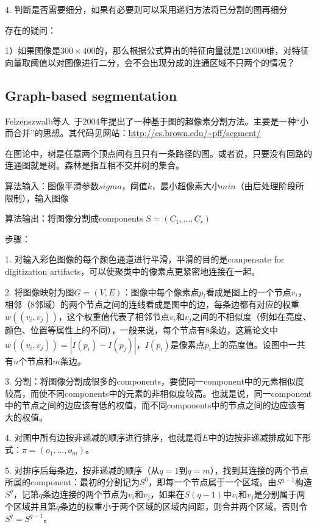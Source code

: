 \documentclass[12pt]{article}
\begin{document}
4. 判断是否需要细分，如果有必要则可以采用递归方法将已分割的图再细分

存在的疑问：

1）如果图像是$300 \times 400$的，那么根据公式算出的特征向量就是$120000$维，对特征向量取阈值以对图像进行二分，会不会出现分成的连通区域不只两个的情况？


\subsection{Graph-based segmentation}

Felzenszwalb等人~\cite{felzenszwalb2004efficient}于2004年提出了一种基于图的超像素分割方法。主要是一种“小而合并”的思想。其代码见网站：\url{http://cs.brown.edu/~pff/segment/}

在图论中，树是任意两个顶点间有且只有一条路径的图。或者说，只要没有回路的连通图就是树。森林是指互相不交并树的集合。

算法输入：图像平滑参数$sigma$，阈值$k$，最小超像素大小$min$（由后处理阶段所限制），输入图像

算法输出：将图像分割成components $S = (C_1, \ldots, C_r)$

步骤：

1. 对输入彩色图像的每个颜色通道进行平滑，平滑的目的是compensate for digitization artifacts，可以使聚类中的像素点更紧密地连接在一起。

2. 将图像映射为图$G = (V, E)$：图像中每个像素点$p_i$看成是图上的一个节点$v_i$，相邻（8邻域）的两个节点之间的连线看成是图中的边，每条边都有对应的权重$w((v_i, v_j))$，这个权重值代表了相邻节点$v_i$和$v_j$之间的不相似度（例如在亮度、颜色、位置等属性上的不同），一般来说，每个节点有8条边，这篇论文中$w((v_i, v_j)) = |I(p_i)-I(p_j)|$，$I(p_i)$是像素点$p_i$上的亮度值。设图中一共有$n$个节点和$m$条边。

3. 分割：将图像分割成很多的components，要使同一component中的元素相似度较高，而使不同components中的元素的非相似度较高。也就是说，同一component中的节点之间的边应该有低的权值，而不同components中的节点之间的边应该有大的权值。

4. 对图中所有边按非递减的顺序进行排序，也就是将$E$中的边按非递减排成如下形式：$\pi = (o_1, \ldots, o_m)$。

5. 对排序后每条边，按非递减的顺序（从$q=1$到$q=m$），找到其连接的两个节点所属的component：最初的分割记为$S^0$，即每一个节点属于一个区域。由$S^{q-1}$构造$S^q$，记第$q$条边连接的两个节点为$v_i$和$v_j$，如果在$S(q-1)$中$v_i$和$v_j$是分别属于两个区域并且第$q$条边的权重小于两个区域的区域内间距，则合并两个区域。否则令$S^q = S^{q-1}$。
\end{document}
